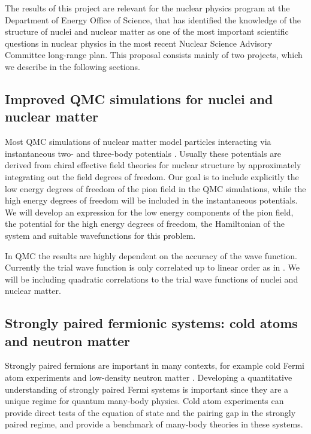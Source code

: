\documentclass[12pt,letterpaper]{article}
\begin{document}
The results of this project are relevant for the nuclear physics program at 
the Department of Energy Office of Science, that has identified the 
knowledge of the structure of nuclei and nuclear matter as one of the most 
important scientific questions in nuclear physics in the most recent Nuclear 
Science Advisory Committee long-range plan. This proposal consists mainly of 
two projects, which we describe in the following sections.

\subsection{Improved QMC simulations for nuclei and nuclear matter}


Most QMC simulations of nuclear matter model particles interacting via
instantaneous two- and three-body
potentials \cite{car15}. Usually these potentials are derived from chiral 
effective field theories for nuclear structure by approximately integrating 
out the field
degrees of freedom. Our goal is to include explicitly the low energy degrees 
of freedom of the pion field in the QMC
simulations, while the high energy degrees of freedom will be included in 
the instantaneous potentials. We will develop an expression for the low 
energy components of the pion field, the potential for the high energy 
degrees of freedom, the Hamiltonian of the system and suitable wavefunctions 
for this problem.

In QMC the results are highly dependent on the accuracy of the wave function. Currently the trial wave function is only correlated up to linear order as in \cite{gan14}. We will be including quadratic correlations to the trial wave functions of nuclei and nuclear matter.

\subsection{Strongly paired fermionic systems: cold atoms and neutron 
matter}

Strongly paired fermions are important in many contexts, for example cold 
Fermi atom experiments and low-density neutron
matter \cite{gez08,gez10}.
Developing a quantitative understanding of strongly paired
Fermi systems is important since they are a unique
regime for quantum many-body physics.
Cold atom experiments can provide direct tests of the
equation of state and the pairing gap in the strongly
paired regime, and provide a benchmark
of many-body theories in these systems.
\end{document}
